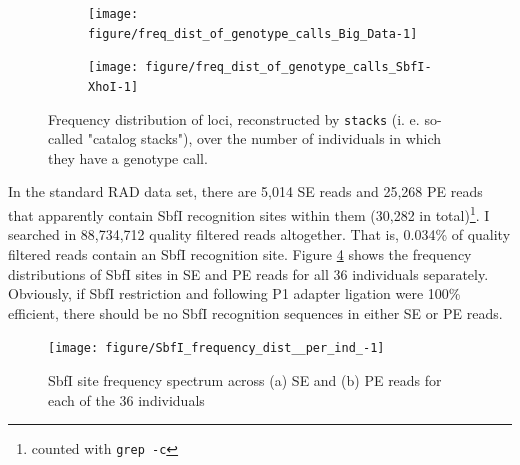 \documentclass[a4paper,12pt,times,print,index, custombib]{PhDThesisPSnPDF}\usepackage[]{graphicx}\usepackage[]{color}
\newenvironment{knitrout}{}{} %
\begin{document}
\begin{figure}
\centering
\begin{subfigure}[t]{.495\textwidth}
\begin{knitrout}
\color{fgcolor}

{\centering \texttt{[image: figure/freq\_dist\_of\_genotype\_calls\_Big\_Data-1]} 

}



\end{knitrout}
\caption{}
\label{Big_Data:freq_dist_of_genotype_calls}
\end{subfigure}
\hfill
\begin{subfigure}[t]{.495\textwidth}
\begin{knitrout}
\color{fgcolor}

{\centering \texttt{[image: figure/freq\_dist\_of\_genotype\_calls\_SbfI-XhoI-1]} 

}



\end{knitrout}
\caption{}
\label{ddRAD:freq_dist_of_genotype_calls}
\end{subfigure}
\caption{Frequency distribution of loci, reconstructed by \texttt{stacks} (i. e. so-called "catalog stacks"), over the number of individuals in which they have a genotype call.}
\label{freq_dist_of_genotype_calls}
\end{figure}


In the standard RAD data set, there are 5,014 SE reads and 25,268 PE reads that apparently contain SbfI recognition sites within them (30,282 in total)\footnote{counted with \texttt{grep -c}}. I searched in 88,734,712 quality filtered reads altogether. That is, 0.034\% of quality filtered reads contain an SbfI recognition site. Figure \ref{SbfI_frequency_dist_per_ind} shows the frequency distributions of SbfI sites in SE and PE reads for all 36 individuals separately. Obviously, if SbfI restriction and following P1 adapter ligation were 100\% efficient, there should be no SbfI recognition sequences in either SE or PE reads. 

\begin{figure}[htb]
\centering
\begin{knitrout}
\color{fgcolor}

{\centering \texttt{[image: figure/SbfI\_frequency\_dist\_\_per\_ind\_-1]} 

}



\end{knitrout}
\caption{SbfI site frequency spectrum across (a) SE and (b) PE reads for each of the 36 individuals}
\label{SbfI_frequency_dist_per_ind}
\end{figure}
\end{document}
